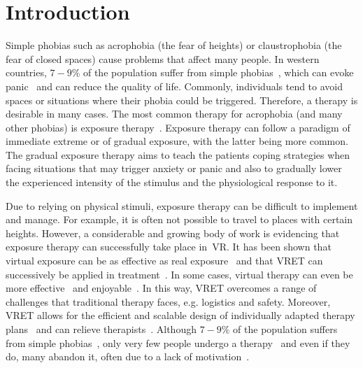 \section{Introduction}
\label{sec:intro}
Simple phobias such as acrophobia (the fear of heights) or claustrophobia (the fear of closed spaces) cause problems that affect many people. In western countries, $7{-}9\%$ of the population suffer from simple phobias~\cite{americanpsychiatricassociation2013}, which can evoke panic~\cite{who2019} and can reduce the quality of life. Commonly, individuals tend to avoid spaces or situations where their phobia could be triggered. Therefore, a therapy is desirable in many cases. The most common therapy for acrophobia (and many other phobias) is exposure therapy~\cite{neudeck2005}. Exposure therapy can follow a paradigm of immediate extreme or of gradual exposure, with the latter being more common. 
The gradual exposure therapy aims to teach the patients coping strategies when facing situations that may trigger anxiety or panic and also to gradually lower the experienced intensity of the stimulus and the physiological response to it.

Due to relying on physical stimuli, exposure therapy can be difficult to implement and manage. For example, it is often not possible to travel to places with certain heights.
However, a considerable and growing body of work is evidencing that exposure therapy can successfully take place in~\ac{VR}. It has been shown that virtual exposure can be as effective as real exposure~\cite{cote2008, emmelkamp2001, emmelkamp2002, parsons2008} and that \ac{VRET} can successively be applied in treatment~\cite{emmelkamp2002, powers2008}. In some cases, virtual therapy can even be more effective~\cite{klinger2005,krijn2007, coelho2009} and enjoyable~\cite{coelho2009, garcia-palacios2001, garcia-palacios2007}.
In this way, \ac{VRET} overcomes a range of challenges that traditional therapy faces, e.g. logistics and safety. Moreover, \ac{VRET} allows for the efficient and scalable design of individually adapted therapy plans~\cite{lindner2017, powers2008} and can relieve therapists~\cite{coelho2009, gorini2008}.
Although $7{-}9\%$ of the population suffers from simple phobias~\cite{americanpsychiatricassociation2013}, only very few people undergo a therapy~\cite{magee1996} and even if they do, many abandon it, often due to a lack of motivation~\cite{andrade2014,botella2011, boyd1990, garcia-palacios2007}.

